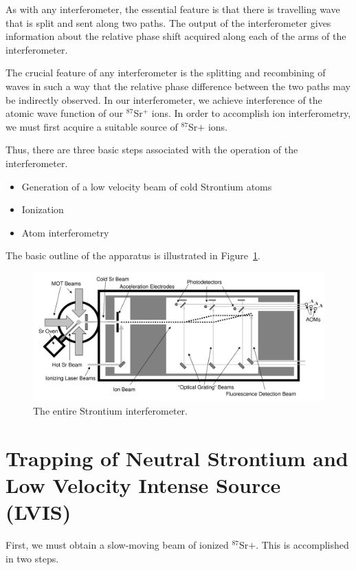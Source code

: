 As with any interferometer, the essential feature is that there is travelling wave that is split and sent along two paths. The output of the interferometer gives information about the relative phase shift acquired along each of the arms of the interferometer. 

The crucial feature of any interferometer is the splitting and recombining of waves in such a way that the relative phase difference between the two paths may be indirectly observed. In our interferometer, we achieve interference of the atomic wave function of our $^{87}$Sr$^+$ ions. 
In order to accomplish ion interferometry, we must first acquire a suitable source of $^{87}$Sr$+$ ions. 

Thus, there are three basic steps associated with the operation of the interferometer. 
\begin{itemize}
\item Generation of a low velocity beam of cold Strontium atoms   
\item Ionization 
\item Atom interferometry
\end{itemize} 

The basic outline of the apparatus is illustrated in Figure~\ref{fig:IonInterferometer}.

\begin{figure}
\centerline{
\includegraphics[totalheight=0.3\textheight]{interferometer_diagram}
}
\caption[Ion Interferometer]{\label{fig:IonInterferometer}
The entire Strontium interferometer. } 
\end{figure}

\section{Trapping of Neutral Strontium and Low Velocity Intense Source (LVIS)}

First, we must obtain a slow-moving beam of ionized $^{87}$Sr$+$. This is accomplished in two steps. 

